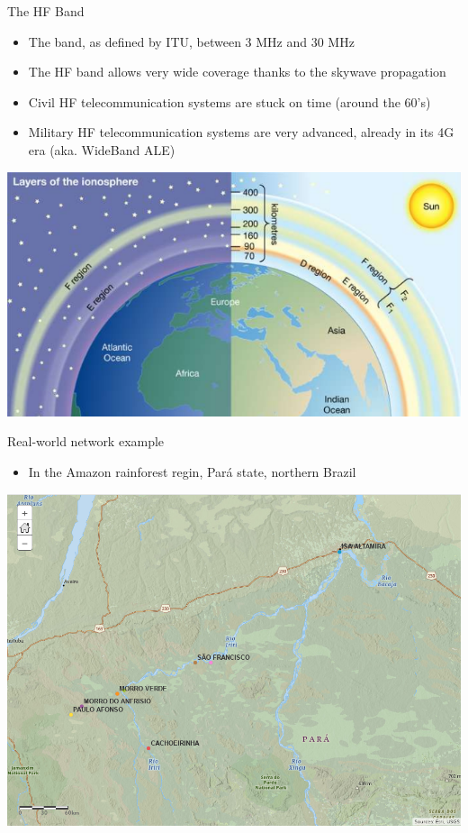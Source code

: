 \documentclass[aspectratio=169,xcolor={x11names,svgnames,dvipsnames}]{beamer}
\begin{document}
\begin{frame}{The HF Band}

  \begin{itemize}
    \item The band, as defined by ITU, between 3 MHz and 30 MHz
    \item The HF band allows very wide coverage thanks to the skywave propagation
    \item Civil HF telecommunication systems are stuck on time (around the 60's)
    \item Military HF telecommunication systems are very advanced, already in its 4G era (aka. WideBand ALE)
  \end{itemize}

\begin{center}
  \includegraphics[width=.45\columnwidth]{ionosfera.png}
\end{center}

\end{frame}

\begin{frame}{Real-world network example}

  \begin{itemize}
  \item In the Amazon rainforest regin, Pará state, northern Brazil
  \end{itemize}

\begin{center}
  \includegraphics[width=.57\columnwidth]{radio_stations.png}
\end{center}

\end{frame}
\end{document}

